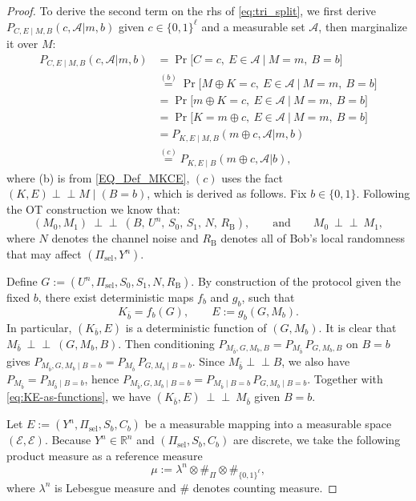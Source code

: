 \documentclass[onecolumn]{IEEEtran} %
\newcommand{\1}{\mathbbm{1}}
\theoremstyle{boldremark}
\newcommand{\pperp}{\mathrel{\perp\!\!\!\perp}}
\begin{document}
\begin{proof}
To derive the second term on the \gls{rhs} of \eqref{eq:tri_split}, we first derive $P_{C,E\mid M,B}(c,\mathcal{A}|m,b)$ given $c\in\{0,1\}^\ell$ and a measurable set $\mathcal{A}$, then marginalize it over $M$:
\begin{align}
P_{C,E\mid M,B}(c,\mathcal{A}|m,b)
&= \Pr\!\big[C=c,\ E\in\mathcal{A}\ \big|\ M=m,\ B=b\big] \\
&\overset{(b)}= \Pr\!\big[M\oplus K=c,\ E\in\mathcal{A}\ \big|\ M=m,\ B=b\big] \\
&= \Pr\!\big[m\oplus K=c,\ E\in\mathcal{A}\ \big|\ M=m,\ B=b\big] \\
&= \Pr\!\big[K=m\oplus c,\ E\in\mathcal{A}\ \big|\ M=m,\ B=b\big] \\
&= P_{K,E\mid M,B}(m\oplus c,\mathcal{A}|m,b) \\
&\overset{(c)}{=} P_{K,E\mid B}(m\oplus c,\mathcal{A}|b),\label{EQ_PCE_PKE}
\end{align}
where (b) is from \eqref{EQ_Def_MKCE}, $(c)$ uses the fact $(K,E)\pperp M \mid (B=b)$, which is derived as follows. 
Fix $b\in\{0,1\}$. 
Following the OT construction we know that:
\begin{equation}\label{eq:msg-indep-model}
(M_0,M_1)\ \pperp\ (B,\,U^n,\,S_0,\,S_1,\,N,\,R_{\mathrm B}),
\qquad\text{and}\qquad
M_0\ \pperp\ M_1,
\end{equation}
where $N$ denotes the channel noise and $R_{\mathrm B}$ denotes all of Bob's local randomness
that may affect $(\Pi_{\mathrm{sel}},Y^n)$.

Define $  G := (U^n,\Pi_{\mathrm{sel}},S_0,S_1,N,R_{\mathrm B}).$ By construction of the protocol given the fixed $b$, there exist deterministic maps $f_b$ and $g_b$, such that
\begin{equation}\label{eq:KE-as-functions}
  K_{\bar b} = f_b(G),
  \qquad
  E := g_b(G,M_b).
\end{equation}
In particular, $(K_{\bar b},E)$ is a deterministic function of $(G,M_b)$. It is clear that
$  M_{\bar b}\ \pperp\ (G,M_b,B).$ Then conditioning \(P_{M_{\bar b},G,M_b,B}=P_{M_{\bar b}}\,P_{G,M_b,B}\) on \(B=b\) gives
$P_{M_{\bar b},G,M_b\mid B=b}=P_{M_{\bar b}}\,P_{G,M_b\mid B=b}.$ Since \(M_{\bar b}\pperp B\), we also have \(P_{M_{\bar b}}=P_{M_{\bar b}\mid B=b}\), hence
\(P_{M_{\bar b},G,M_b\mid B=b}=P_{M_{\bar b}\mid B=b}\,P_{G,M_b\mid B=b}\). Together with \eqref{eq:KE-as-functions}, we have $ (K_{\bar b},E)\ \pperp\ M_{\bar b}$ given $ B=b.$

Let $E:=(Y^n,\Pi_{\mathrm{sel}},S_b,C_b)$ be a measurable mapping into a measurable space $(\mathcal{E},\mathscr{E})$. Because $Y^n\in\mathbb{R}^n$ and $(\Pi_{\mathrm{sel}},S_b,C_b)$ are discrete, we take the following product measure as a reference measure
\[
\mu := \lambda^n \otimes \#_{\Pi} \otimes \#_{\{0,1\}^{\ell}},
\]
where $\lambda^n$ is Lebesgue measure and $\#$ denotes counting measure.


\end{proof}
\end{document}
